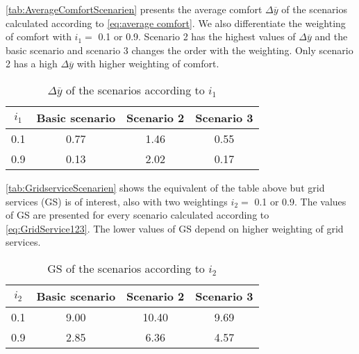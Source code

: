 \autoref{tab:AverageComfortScenarien} presents the average comfort $\Delta \overline{y}$ of the scenarios calculated according to \autoref{eq:average comfort}. We also differentiate the weighting of comfort with $i_\text{1} =$ 0.1 or 0.9. Scenario 2 has the highest values of $\Delta \overline{y}$ and the basic scenario and scenario 3 changes the order with the weighting. Only scenario 2 has a high $\Delta \overline{y}$ with higher weighting of comfort.  
    \begin{table}[H]
        \centering
        \begin{tabular}{c||c|c|c}
          $i_\text{1}$  &  Basic scenario & Scenario 2 & Scenario 3\\
          \hline  \hline
             0.1 & 0.77 & 1.46 & 0.55\\
             0.9 & 0.13 & 2.02 & 0.17\\
        \end{tabular}
        \caption{$\Delta \overline{y}$ of the scenarios according to $i_\text{1}$}
        \label{tab:AverageComfortScenarien}
    \end{table}
    
\autoref{tab:GridserviceScenarien} shows the equivalent of the table above but grid services (GS) is of interest, also with two weightings  $i_\text{2} =$ 0.1 or 0.9. The values of GS are presented for every scenario calculated according to \autoref{eq:GridService123}. The lower values of GS depend on higher weighting of grid services. 
    \begin{table}[H]
        \centering
        \begin{tabular}{c||c|c|c}
          $i_\text{2}$  &  Basic scenario & Scenario 2 & Scenario 3\\
          \hline  \hline
             0.1 & 9.00 & 10.40 & 9.69 \\
             0.9 & 2.85 & 6.36 & 4.57\\
        \end{tabular}
        \caption{GS of the scenarios according to $i_\text{2}$}
        \label{tab:GridserviceScenarien}
    \end{table}
    
